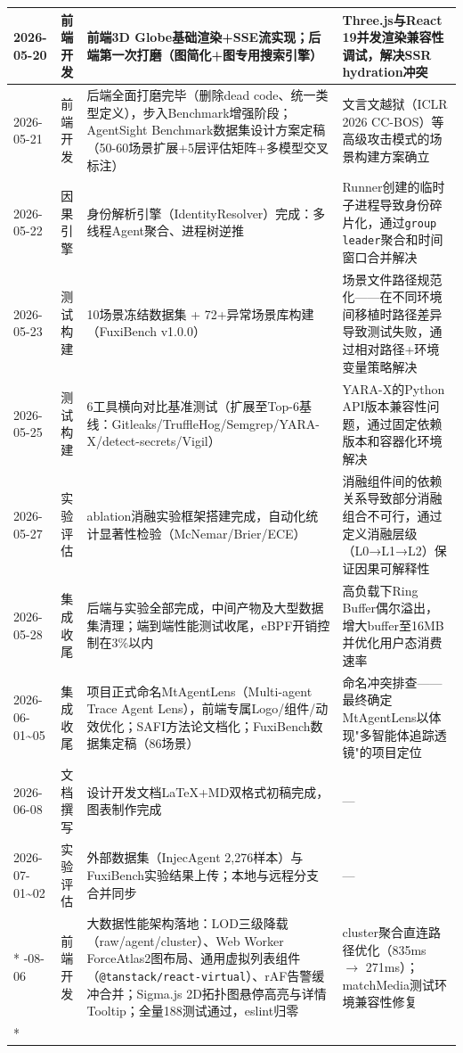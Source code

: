 \documentclass[a4paper]{ctexart}
\makeatletter
\renewcommand{\_}{%
  \ifmmode
    \nfss@text{\textunderscore}%
  \else
    \textunderscore\discretionary{}{}{}%
  \fi}
\makeatother
\begin{document}
{\begin{longtable}{@{} p{4.2cm} p{1.8cm} p{5cm} p{4.2cm} @{}}
\hline
2026-05-20 & 前端开发 & 前端3D Globe基础渲染+SSE流实现；后端第一次打磨（图简化+图专用搜索引擎） & Three.js与React 19并发渲染兼容性调试，解决SSR hydration冲突 \\
\hline
2026-05-21 & 前端开发 & 后端全面打磨完毕（删除dead code、统一类型定义），步入Benchmark增强阶段；AgentSight Benchmark数据集设计方案定稿（50-60场景扩展+5层评估矩阵+多模型交叉标注） & 文言文越狱（ICLR 2026 CC-BOS）等高级攻击模式的场景构建方案确立 \\
\hline
2026-05-22 & 因果引擎 & 身份解析引擎（IdentityResolver）完成：多线程Agent聚合、进程树逆推 & Runner创建的临时子进程导致身份碎片化，通过\texttt{group\_leader}聚合和时间窗口合并解决 \\
\hline
2026-05-23 & 测试构建 & 10场景冻结数据集 + 72+异常场景库构建（FuxiBench v1.0.0） & 场景文件路径规范化——在不同环境间移植时路径差异导致测试失败，通过相对路径+环境变量策略解决 \\
\hline
2026-05-25 & 测试构建 & 6工具横向对比基准测试（扩展至Top-6基线：Gitleaks/TruffleHog/Semgrep/YARA-X/detect-secrets/Vigil） & YARA-X的Python API版本兼容性问题，通过固定依赖版本和容器化环境解决 \\
\hline
2026-05-27 & 实验评估 & ablation消融实验框架搭建完成，自动化统计显著性检验（McNemar/Brier/ECE） & 消融组件间的依赖关系导致部分消融组合不可行，通过定义消融层级（L0→L1→L2）保证因果可解释性 \\
\hline
2026-05-28 & 集成收尾 & 后端与实验全部完成，中间产物及大型数据集清理；端到端性能测试收尾，eBPF开销控制在3\%以内 & 高负载下Ring Buffer偶尔溢出，增大buffer至16MB并优化用户态消费速率 \\
\hline
2026-06-01\textasciitilde{}05 & 集成收尾 & 项目正式命名MtAgentLens（Multi-agent Trace Agent Lens），前端专属Logo/组件/动效优化；SAFI方法论文档化；FuxiBench数据集定稿（86场景） & 命名冲突排查——最终确定MtAgentLens以体现"多智能体追踪透镜"的项目定位 \\
\hline
2026-06-08 & 文档撰写 & 设计开发文档LaTeX+MD双格式初稿完成，图表制作完成 & — \\
\hline
2026-07-01\textasciitilde{}02 & 实验评估 & 外部数据集（InjecAgent 2,276样本）与FuxiBench实验结果上传；本地与远程分支合并同步 & — \\*
\hline
2026-08-06 & 前端开发 & 大数据性能架构落地：LOD三级降载（raw/agent/cluster）、Web Worker ForceAtlas2图布局、通用虚拟列表组件（\texttt{@tanstack/react-virtual}）、rAF告警缓冲合并；Sigma.js 2D拓扑图悬停高亮与详情Tooltip；全量188测试通过，eslint归零 & cluster聚合直连路径优化（835ms $\rightarrow$ 271ms）；matchMedia测试环境兼容性修复 \\*

\end{longtable}}
\end{document}
